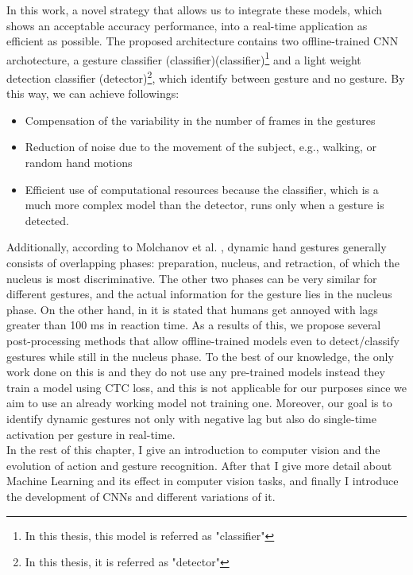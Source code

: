 In this work,  a novel strategy that allows us to integrate these models, which shows an acceptable accuracy performance,  into a real-time application as efficient as possible. The proposed architecture contains two offline-trained CNN archotecture, a gesture classifier (classifier)(classifier)\footnote{In this thesis, this model is referred as "classifier"} and a light weight detection classifier (detector)\footnote{In this thesis, it is referred as "detector"},  which identify between gesture and no gesture. By this way, we can achieve followings:
\begin{itemize}
\item Compensation  of the variability  in the number of frames in the gestures
\item Reduction  of noise due to the movement of the subject, e.g., walking, or random hand motions
\item Efficient use of computational resources because the classifier, which is a much more complex model than the detector, runs only when a gesture is detected. 
\end{itemize}

Additionally,  according to Molchanov et al.  \cite{molchanov_online_2016}, dynamic hand gestures generally consists of overlapping phases:  preparation, nucleus, and retraction,  of which the nucleus is most discriminative.   The other two phases can be very similar for different gestures, and the actual information for the gesture lies in the nucleus phase.   On the other hand,  in \cite{card_information_1991,miller_response_1968} it is stated that humans get annoyed with lags greater than 100 ms in reaction time. As a results of this, we propose several post-processing methods that allow offline-trained models even to detect/classify gestures while still in the nucleus phase.   To the best of our knowledge, the only work done on this is \cite{molchanov_online_2016} and they do not use any pre-trained models instead they train a model using CTC  loss, and this is not applicable for our purposes since we aim to use an already working model not training one. Moreover, our goal is to identify dynamic gestures not only with negative lag but also do single-time activation per gesture in real-time.\\

In the rest of this chapter, I give an introduction to computer vision and the evolution of action and gesture recognition. After that I  give more detail about Machine Learning and its effect in computer vision tasks, and finally I introduce the development of CNNs and different variations of it.\\
\clearpage
